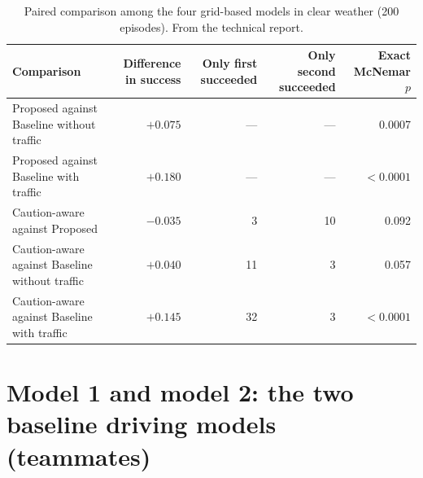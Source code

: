 \documentclass[11pt,a4paper]{article}
\begin{document}

\begin{table}[H]\centering\scriptsize
\caption{Paired comparison of every model against the image-only model on the same episodes. Positive differences favour the model named in the second column.}\label{tab:pairedimage}
\resizebox{\textwidth}{!}{}
\end{table}

\begin{table}[H]\centering\small
\caption{Paired comparison among the four grid-based models in clear weather (200 episodes). From the technical report.}\label{tab:pairedgrid}
\begin{tabularx}{\textwidth}{@{}Xrrrr@{}}\toprule
Comparison & Difference in success & Only first succeeded & Only second succeeded & Exact McNemar $p$\\\midrule
Proposed against Baseline without traffic & $+0.075$ & --- & --- & 0.0007\\
Proposed against Baseline with traffic & $+0.180$ & --- & --- & $<0.0001$\\
Caution-aware against Proposed & $-0.035$ & 3 & 10 & 0.092\\
Caution-aware against Baseline without traffic & $+0.040$ & 11 & 3 & 0.057\\
Caution-aware against Baseline with traffic & $+0.145$ & 32 & 3 & $<0.0001$\\\bottomrule
\end{tabularx}
\end{table}

\section{Model 1 and model 2: the two baseline driving models (teammates)}
\end{document}
